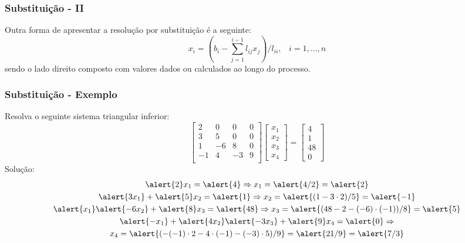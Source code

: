 \documentclass{beamer}
\theoremstyle{mystyle}
\begin{document}
\begin{frame}
	\frametitle{Substituição - II}
	Outra forma de apresentar a resolução por substituição é a seguinte:
	\begin{equation*}
		x_{i} = \left(b_{i} - \sum_{j=1}^{i-1} l_{ij} x_{j} \right) / l_{ii}, \;\;\; i = 1,\ldots, n
	\end{equation*}
	sendo o lado direito composto com valores dados ou calculados ao longo do processo.
\end{frame}

\begin{frame}
	\frametitle{Substituição - Exemplo}
	Resolva o seguinte sistema triangular inferior:
	\begin{equation*}
		\left[
		\begin{array}{cccc}
			2 & 0 & 0 & 0 \\
			3 & 5 & 0 & 0 \\
			1 & -6 & 8 & 0 \\
			-1 & 4 & -3 & 9 \\
		\end{array}
		\right] 
		\begin{bmatrix} x_{1} \\ x_{2} \\ x_{3} \\ x_{4} \end{bmatrix}
		=
		\begin{bmatrix} 4 \\ 1 \\ 48 \\ 0 \end{bmatrix}
	\end{equation*}
	\pause 
	Solução:
	\begin{gather*}
		\alert{2}x_{1} = \alert{4} \Rightarrow x_{1} = \alert{4/2} = \alert{2}\\
		\alert{3x_{1}} + \alert{5}x_{2} = \alert{1} \Rightarrow x_{2} = \alert{(1 - 3\cdot2)/5} = \alert{-1}\\
		\alert{x_{1}} \alert{- 6x_{2}} + \alert{8}x_{3} = \alert{48} \Rightarrow x_{3} = \alert{(48 - 2 - (-6)\cdot (-1))/8} = \alert{5}\\
		\alert{-x_{1}} + \alert{4x_{2}} \alert{-3x_{3}} + \alert{9}x_{4} = \alert{0} \Rightarrow\\
		x_{4} = \alert{(-(-1)\cdot2 - 4\cdot(-1)  - (-3)\cdot 5)/9} = \alert{21/9} = \alert{7/3}
	\end{gather*}
\end{frame}
\end{document}
